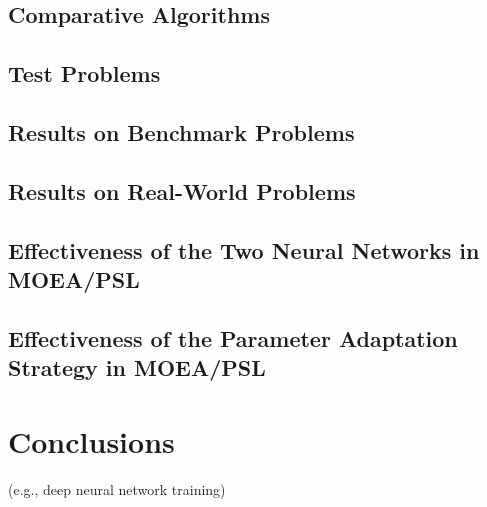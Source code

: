 \documentclass[journal]{IEEEtran}
\begin{document}
\subsection{Comparative Algorithms}

\subsection{Test Problems}

\subsection{Results on Benchmark Problems}

\subsection{Results on Real-World Problems}

\subsection{Effectiveness of the Two Neural Networks in MOEA/PSL}\label{sec:twoNNs}

\subsection{Effectiveness of the Parameter Adaptation Strategy in MOEA/PSL}

\section{Conclusions}


 (e.g., deep neural network training)

\ifCLASSOPTIONcaptionsoff
  \newpage
\fi




\end{document}
